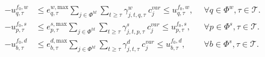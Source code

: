 \begin{align}
-u_{q,\tau}^{f_0, w} & \le e_{q,\tau}^{w, \text{max}} \sum_{j\in\Phi^{ht}} \sum_{t \ge \tau} \gamma_{j,t,q,\tau}^{w} \: c^{var}_{j} \le u_{q,\tau}^{f_0, w}, \ \ & \forall q \in \Phi^{w}, \tau \in \mathcal{T}.\\
-u_{p,\tau}^{f_0, s} & \le e_{p,\tau}^{s, \text{max}} \sum_{j\in\Phi^{ht}} \sum_{t \ge \tau} \gamma_{j,t,p,\tau}^{s} \: c^{var}_{j} \le u_{p,\tau}^{f_0, s}, \ \ & \forall p \in \Phi^{s}, \tau \in \mathcal{T}. \\
-u_{b,\tau}^{f_0, d} & \le e_{b,\tau}^{d, \text{max}} \sum_{j\in\Phi^{ht}} \sum_{t \ge \tau} \gamma_{j,t,\tau}^{d} \: c^{var}_{j} \le u_{b,\tau}^{f_0, d}, \ \ & \forall b \in \Phi^{s}, \tau \in \mathcal{T}.
\end{align}